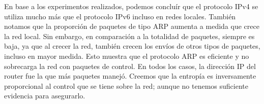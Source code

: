 En base a los experimentos realizados, podemos concluír que el protocolo IPv4 se utiliza mucho más que el protocolo IPv6 incluso en redes locales.
También notamos que la proporción de paquetes de tipo ARP aumenta a medida que crece la red local. Sin embargo, en comparación a la totalidad de paquetes, siempre es baja,
ya que al crecer la red, también crecen los envíos de otros tipos de paquetes, incluso en mayor medida. Esto muestra que el protocolo ARP es eficiente y no sobrecarga la
red con paquetes de control.
En todos los casos, la dirección IP del router fue la que más paquetes manejó.
Creemos que la entropía es inversamente proporcional al control que se tiene sobre la red; aunque no tenemos suficiente evidencia para asegurarlo.
